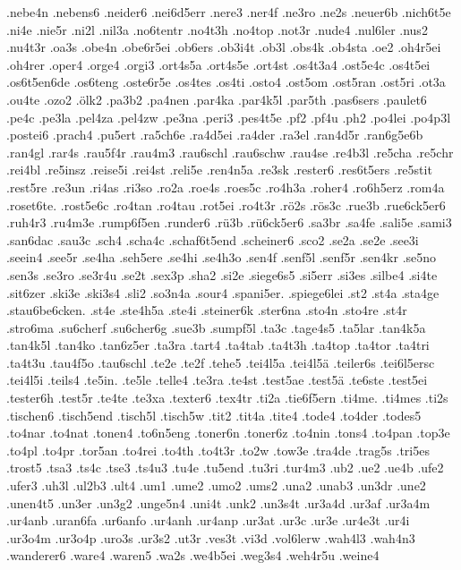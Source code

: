 {.nebe4n
.nebens6
.neider6
.nei6d5err
.nere3
.ner4f
.ne3ro
.ne2s
.neuer6b
.nich6t5e
.ni4e
.nie5r
.ni2l
.nil3a
.no6tentr
.no4t3h
.no4top
.not3r
.nude4
.nul6ler
.nus2
.nu4t3r
.oa3s
.obe4n
.obe6r5ei
.ob6ers
.ob3i4t
.ob3l
.obs4k
.ob4sta
.oe2
.oh4r5ei
.oh4rer
.oper4
.orge4
.orgi3
.ort4s5a
.ort4s5e
.ort4st
.os4t3a4
.ost5e4c
.os4t5ei
.os6t5en6de
.os6teng
.oste6r5e
.os4tes
.os4ti
.osto4
.ost5om
.ost5ran
.ost5ri
.ot3a
.ou4te
.ozo2
.ölk2
.pa3b2
.pa4nen
.par4ka
.par4k5l
.par5th
.pas6sers
.paulet6
.pe4c
.pe3la
.pel4za
.pel4zw
.pe3na
.peri3
.pes4t5e
.pf2
.pf4u
.ph2
.po4lei
.po4p3l
.postei6
.prach4
.pu5ert
.ra5ch6e
.ra4d5ei
.ra4der
.ra3el
.ran4d5r
.ran6g5e6b
.ran4gl
.rar4s
.rau5f4r
.rau4m3
.rau6schl
.rau6schw
.rau4se
.re4b3l
.re5cha
.re5chr
.rei4bl
.re5insz
.reise5i
.rei4st
.reli5e
.ren4n5a
.re3sk
.rester6
.res6t5ers
.re5stit
.rest5re
.re3un
.ri4as
.ri3so
.ro2a
.roe4s
.roes5c
.ro4h3a
.roher4
.ro6h5erz
.rom4a
.roset6te.
.rost5e6c
.ro4tan
.ro4tau
.rot5ei
.ro4t3r
.rö2s
.rös3c
.rue3b
.rue6ck5er6
.ruh4r3
.ru4m3e
.rump6f5en
.runder6
.rü3b
.rü6ck5er6
.sa3br
.sa4fe
.sali5e
.sami3
.san6dac
.sau3c
.sch4
.scha4c
.schaf6t5end
.scheiner6
.sco2
.se2a
.se2e
.see3i
.seein4
.see5r
.se4ha
.seh5ere
.se4hi
.se4h3o
.sen4f
.senf5l
.senf5r
.sen4kr
.se5no
.sen3s
.se3ro
.se3r4u
.se2t
.sex3p
.sha2
.si2e
.siege6s5
.si5err
.si3es
.silbe4
.si4te
.sit6zer
.ski3e
.ski3s4
.sli2
.so3n4a
.sour4
.spani5er.
.spiege6lei
.st2
.st4a
.sta4ge
.stau6be6cken.
.st4e
.ste4h5a
.ste4i
.steiner6k
.ster6na
.sto4n
.sto4re
.st4r
.stro6ma
.su6cherf
.su6cher6g
.sue3b
.sumpf5l
.ta3c
.tage4s5
.ta5lar
.tan4k5a
.tan4k5l
.tan4ko
.tan6z5er
.ta3ra
.tart4
.ta4tab
.ta4t3h
.ta4top
.ta4tor
.ta4tri
.ta4t3u
.tau4f5o
.tau6schl
.te2e
.te2f
.tehe5
.tei4l5a
.tei4l5ä
.teiler6s
.tei6l5ersc
.tei4l5i
.teils4
.te5in.
.te5le
.telle4
.te3ra
.te4st
.test5ae
.test5ä
.te6ste
.test5ei
.tester6h
.test5r
.te4te
.te3xa
.texter6
.tex4tr
.ti2a
.tie6f5ern
.ti4me.
.ti4mes
.ti2s
.tischen6
.tisch5end
.tisch5l
.tisch5w
.tit2
.tit4a
.tite4
.tode4
.to4der
.todes5
.to4nar
.to4nat
.tonen4
.to6n5eng
.toner6n
.toner6z
.to4nin
.tons4
.to4pan
.top3e
.to4pl
.to4pr
.tor5an
.to4rei
.to4th
.to4t3r
.to2w
.tow3e
.tra4de
.trag5s
.tri5es
.trost5
.tsa3
.ts4c
.tse3
.ts4u3
.tu4e
.tu5end
.tu3ri
.tur4m3
.ub2
.ue2
.ue4b
.ufe2
.ufer3
.uh3l
.ul2b3
.ult4
.um1
.ume2
.umo2
.ums2
.una2
.unab3
.un3dr
.une2
.unen4t5
.un3er
.un3g2
.unge5n4
.uni4t
.unk2
.un3s4t
.ur3a4d
.ur3af
.ur3a4m
.ur4anb
.uran6fa
.ur6anfo
.ur4anh
.ur4anp
.ur3at
.ur3c
.ur3e
.ur4e3t
.ur4i
.ur3o4m
.ur3o4p
.uro3s
.ur3s2
.ut3r
.ves3t
.vi3d
.vol6lerw
.wah4l3
.wah4n3
.wanderer6
.ware4
.waren5
.wa2s
.we4b5ei
.weg3s4
.weh4r5u
.weine4
}
